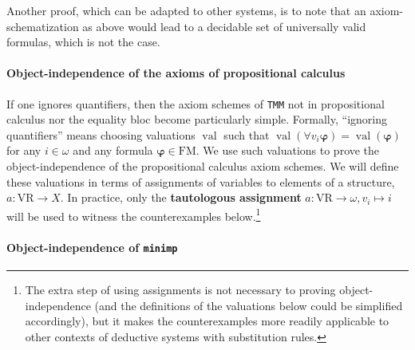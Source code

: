 \documentclass[11pt]{article}
\newcommand*{\define}[1]{\textbf{#1}}%
\renewcommand*{\phi}{\varphi}
\newcommand*{\VR}{\mathrm{VR}}
\newcommand*{\FM}{\mathrm{FM}}
\DeclareMathOperator{\val}{val}
\theoremstyle{plain}
\theoremstyle{definition}
\theoremstyle{remark}
\begin{document}
Another proof, which can be adapted to other systems, is to note that an axiom-schematization
as above would lead to a decidable set of universally valid formulas, which is not the case.





\paragraph{Object-independence of the axioms of propositional calculus}

If one ignores quantifiers, then the axiom schemes of \texttt{TMM} not in propositional calculus
nor the equality bloc become particularly simple.
Formally, ``ignoring quantifiers'' means choosing valuations $\val$ such that
$\val(\forall v_i \bm\phi) = \val(\bm\phi)$ for any $i \in \omega$ and any formula $\bm\phi \in \FM$.
We use such valuations to prove the object-independence of the propositional calculus axiom schemes.
We will define these valuations in terms of assignments of variables to elements of a structure,
$a \colon \VR \to X$.
In practice, only the \define{tautologous assignment} $a \colon \VR \to \omega, v_i \mapsto i$ will
be used to witness the counterexamples below.\footnote{
The extra step of using assignments is not necessary to proving object-independence (and the definitions
of the valuations below could be simplified accordingly), but it makes the counterexamples more readily
applicable to other contexts of deductive systems with substitution rules.}

\paragraph{Object-independence of \texttt{minimp}}
\end{document}
